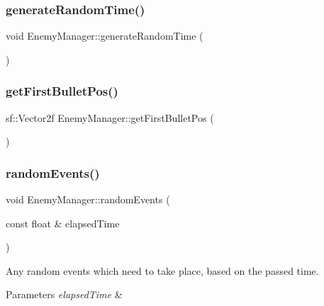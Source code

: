 \subsubsection{\texorpdfstring{generate\+Random\+Time()}{generateRandomTime()}}
{\footnotesize\ttfamily void Enemy\+Manager\+::generate\+Random\+Time (\begin{DoxyParamCaption}{ }\end{DoxyParamCaption})\hspace{0.3cm}{\ttfamily [private]}}

\mbox{\label{class_enemy_manager_a0632e71c86c73e74708d34df6d1fefba}} 
\subsubsection{\texorpdfstring{get\+First\+Bullet\+Pos()}{getFirstBulletPos()}}
{\footnotesize\ttfamily sf\+::\+Vector2f Enemy\+Manager\+::get\+First\+Bullet\+Pos (\begin{DoxyParamCaption}{ }\end{DoxyParamCaption})\hspace{0.3cm}{\ttfamily [inline]}}

\mbox{\label{class_enemy_manager_abafa080764d42fbc020c33e48c7afb2f}} 
\subsubsection{\texorpdfstring{random\+Events()}{randomEvents()}}
{\footnotesize\ttfamily void Enemy\+Manager\+::random\+Events (\begin{DoxyParamCaption}\item[{const float \&}]{elapsed\+Time }\end{DoxyParamCaption})}



Any random events which need to take place, based on the passed time. 


\begin{DoxyParams}{Parameters}
{\em elapsed\+Time} & \\
\hline
\end{DoxyParams}
\mbox{\label{class_enemy_manager_a206ef948ffa7e4d518da91dad493efe6}} 
